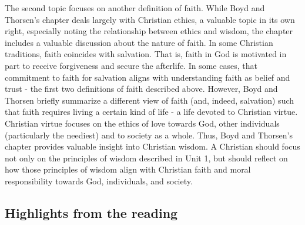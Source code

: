 \documentclass[
]{book}
\begin{document}
The second topic focuses on another definition of faith. While Boyd and Thorsen's chapter deals largely with Christian ethics, a valuable topic in its own right, especially noting the relationship between ethics and wisdom, the chapter includes a valuable discussion about the nature of faith. In some Christian traditions, faith coincides with salvation. That is, faith in God is motivated in part to receive forgiveness and secure the afterlife. In some cases, that commitment to faith for salvation aligns with understanding faith as belief and trust - the first two definitions of faith described above. However, Boyd and Thorsen briefly summarize a different view of faith (and, indeed, salvation) such that faith requires living a certain kind of life - a life devoted to Christian virtue. Christian virtue focuses on the ethics of love towards God, other individuals (particularly the neediest) and to society as a whole. Thus, Boyd and Thorsen's chapter provides valuable insight into Christian wisdom. A Christian should focus not only on the principles of wisdom described in Unit 1, but should reflect on how those principles of wisdom align with Christian faith and moral responsibility towards God, individuals, and society.

\hypertarget{highlights-from-the-reading-7}{%
\subsection*{Highlights from the reading}\label{highlights-from-the-reading-7}}
\end{document}
